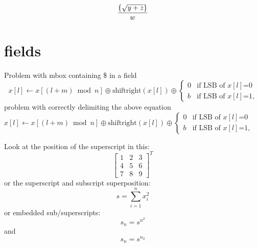 \documentclass{article}
\begin{document}
\[
{\left\{\sqrt{y+z}\right\}\over w}
\]

\section{fields}
Problem with mbox containing \$ in a field
\[
x[l]\leftarrow x[(l+m) \bmod  n] \oplus \mbox{shiftright}(x[l])
 \oplus \left\{ \begin{array}{ll}
                0   & \mbox{if LSB of $x[l]$=0} \\
                b   & \mbox{if LSB of $x[l]$=1,}
               \end{array}
        \right.
\]
problem with correctly delimiting the above equation 
$
x[l]\leftarrow x[(l+m) \bmod  n] \oplus \mbox{shiftright}(x[l])
 \oplus \left\{ \begin{array}{ll}
                0   & \mbox{if LSB of $x[l]$=0} \\
                b   & \mbox{if LSB of $x[l]$=1,}
               \end{array}
        \right.
$

Look at the position of the superscript in this:
\[
  \left[
    \begin{array}{ccc}
      1 & 2 & 3\\
      4 & 5 & 6\\
      7 & 8 & 9
    \end{array}
  \right]^T
\]
or the superscript and subscript superposition:
\[
  s = \sum_{i=1}^n x^2_i
\]
or embedded sub/superscripts:
\[
  s_n=s^{n^2}
\]
and
\[
  s_n=s^{n_2}
\]
\end{document}
